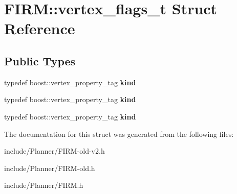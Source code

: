 \hypertarget{struct_f_i_r_m_1_1vertex__flags__t}{\section{\-F\-I\-R\-M\-:\-:vertex\-\_\-flags\-\_\-t \-Struct \-Reference}
\label{struct_f_i_r_m_1_1vertex__flags__t}
}
\subsection*{\-Public \-Types}
\begin{DoxyCompactItemize}
\item 
\hypertarget{struct_f_i_r_m_1_1vertex__flags__t_ac76c9256a586ee6d6f9253ada4929e13}{typedef boost\-::vertex\-\_\-property\-\_\-tag {\bfseries kind}}\label{struct_f_i_r_m_1_1vertex__flags__t_ac76c9256a586ee6d6f9253ada4929e13}

\item 
\hypertarget{struct_f_i_r_m_1_1vertex__flags__t_ac76c9256a586ee6d6f9253ada4929e13}{typedef boost\-::vertex\-\_\-property\-\_\-tag {\bfseries kind}}\label{struct_f_i_r_m_1_1vertex__flags__t_ac76c9256a586ee6d6f9253ada4929e13}

\item 
\hypertarget{struct_f_i_r_m_1_1vertex__flags__t_ac76c9256a586ee6d6f9253ada4929e13}{typedef boost\-::vertex\-\_\-property\-\_\-tag {\bfseries kind}}\label{struct_f_i_r_m_1_1vertex__flags__t_ac76c9256a586ee6d6f9253ada4929e13}

\end{DoxyCompactItemize}


\-The documentation for this struct was generated from the following files\-:\begin{DoxyCompactItemize}
\item 
include/\-Planner/\-F\-I\-R\-M-\/old-\/v2.\-h\item 
include/\-Planner/\-F\-I\-R\-M-\/old.\-h\item 
include/\-Planner/\-F\-I\-R\-M.\-h\end{DoxyCompactItemize}
